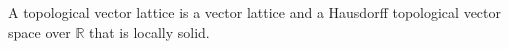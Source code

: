 A topological vector lattice is a vector lattice and a Hausdorff topological vector space over $\mathbb{R}$ that is locally solid.
